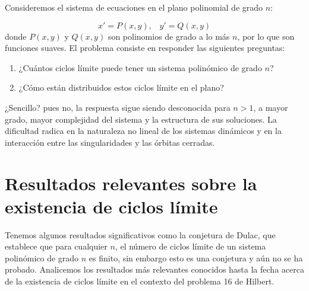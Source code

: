 Consideremos el sistema de ecuaciones en el plano polinomial de grado $n$:

\begin{equation}
	x'=P\left(x,y\right)\text{, }\text{  }y'=Q\left(x,y\right)
\end{equation}
donde $P\left(x,y\right)$ y $Q\left(x,y\right)$ son polinomios de grado a lo más $n$, por lo que son funciones suaves. El problema consiste en responder las siguientes preguntas:
\begin{enumerate}
	\item ¿Cuántos ciclos límite puede tener un sistema polinómico de grado $n$?
	\item ¿Cómo están distribuidos estos ciclos límite en el plano?
\end{enumerate}

¿Sencillo? pues no, la respuesta sigue siendo desconocida para $n>1$, a mayor grado, mayor complejidad del sistema y la estructura de sus soluciones. La dificultad radica en la naturaleza no lineal de los sistemas dinámicos y en la interacción entre las singularidades y las órbitas cerradas.

\section{Resultados relevantes sobre la existencia de ciclos límite}

Tenemos algunos resultados significativos como la conjetura de Dulac, que establece que para cualquier $n$, el número de ciclos límite de un sistema polinómico de grado $n$ es finito, sin embargo esto es una conjetura y aún no se ha probado. Analicemos los resultados más relevantes conocidos hasta la fecha acerca de la existencia de ciclos límite en el contexto del problema 16 de Hilbert.

